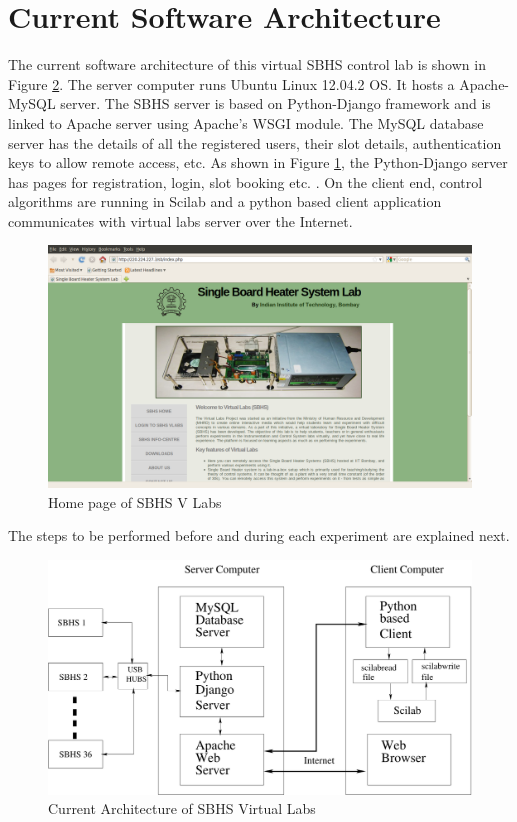 \section{Current Software Architecture} \label{sec:vlabarchi}
The current software architecture of this virtual SBHS control lab is shown in Figure \ref{fig:detail-arch}. The server computer runs Ubuntu Linux 12.04.2 OS. It hosts a Apache-MySQL server. The SBHS server is based on Python-Django framework and is linked to Apache server using Apache's WSGI module. The MySQL database server has the details of all the registered users, their slot details, authentication keys to allow remote access, etc. As shown in Figure \ref{fig:sbhs-website}, the Python-Django server has pages for registration, login, slot booking etc. \cite{vl010}.  On the client end, control algorithms are running in Scilab and a python based client application communicates with virtual labs server over the Internet.



\begin{figure}
\includegraphics[width=\linewidth]{IEEE-Chile/figures/webpage}
\caption{Home page of SBHS V Labs}
\label{fig:sbhs-website}
\end{figure}
The steps to be performed before and during each experiment are explained next.

\begin{figure}
\centering
\includegraphics[width=\linewidth]{IEEE-Chile/figures/new-server-arch.pdf}
\caption{Current Architecture of SBHS Virtual Labs}
\label{fig:detail-arch}
\end{figure}











